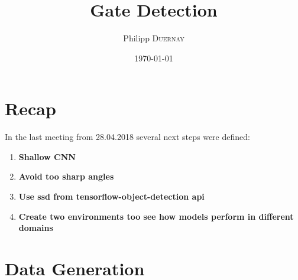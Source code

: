 \documentclass{article}
\title{Gate Detection} %
\author{Philipp \textsc{Duernay}} %
\date{\today} %
\begin{document}
\maketitle


\section{Recap}
In the last meeting from 28.04.2018 several next steps were defined:
\begin{enumerate}
	\item \textbf{Shallow CNN}
	\item \textbf{Avoid too sharp angles}
	\item \textbf{Use ssd from tensorflow-object-detection api}
	\item \textbf{Create two environments too see how models perform in different domains}
\end{enumerate}

\section{Data Generation}
\end{document}
